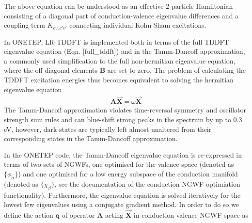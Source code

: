 \documentclass[letterpaper,10pt,english]{sphinxmanual}
\begin{document}
The above equation can be understood as an effective 2-particle
Hamiltonian consisting of a diagonal part of conduction-valence
eigenvalue differences and a coupling term \(K_{cv,c'v'}\)
connecting individual Kohn-Sham excitations.

In ONETEP, LR-TDDFT is implemented both in terms of the full TDDFT
eigenvalue equation (Eqn. {[}full\_tddft{]}) and in the Tamm-Dancoff
approximation, a commonly used simplification to the full non-hermitian
eigenvalue equation, where the off diagonal elements \(\textbf{B}\)
are set to zero. The problem of calculating the TDDFT excitation
energies thus becomes equivalent to solving the hermitian eigenvalue
equation
\begin{equation*}
\begin{split}\textbf{A}\vec{\textbf{X}}=\omega \vec{\textbf{X}}\end{split}
\end{equation*}
The Tamm-Dancoff approximation violates time-reversal symmetry and
oscillator strength sum rules and can blue-shift strong peaks in the
spectrum by up to 0.3 eV, however, dark states are typically left almost
unaltered from their corresponding states in the Tamm-Dancoff
approximation.

In the ONETEP code, the Tamm-Dancoff eigenvalue equation is re-expressed
in terms of two sets of NGWFs, one optimised for the valence space
(denoted as \(\{ \phi_\alpha\}\)) and one optimised for a low energy
subspace of the conduction manifold (denoted as \(\{\chi_\beta \}\),
see the documentation of the conduction NGWF optimiation functionality).
Furthermore, the eigenvalue equation is solved iteratively for the
lowest few eigenvalues using a conjugate gradient method. In order to do
so we define the action \(\textbf{q}\) of operator
\(\textbf{A}\) acting \(\vec{\textbf{X}}\) in conduction-valence
NGWF space as
\end{document}
